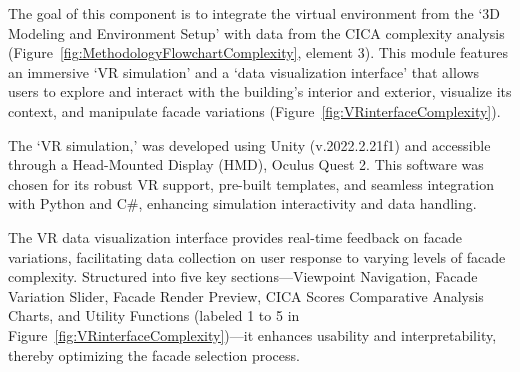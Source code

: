 %


The goal of this component is to integrate the virtual environment from the `3D Modeling and Environment Setup' with data from the CICA complexity analysis (Figure~\ref{fig:MethodologyFlowchartComplexity}, element 3).
This module features an immersive `VR simulation' and a `data visualization interface' that allows users to explore and interact with the building's interior and exterior, visualize its context, and manipulate facade variations (Figure~\ref{fig:VRinterfaceComplexity}).

The `VR simulation,' was developed using Unity (v.2022.2.21f1) and accessible through a Head-Mounted Display (HMD), Oculus Quest 2.
This software was chosen for its robust VR support, pre-built templates, and seamless integration with Python and C\#, enhancing simulation interactivity and data handling.

The VR data visualization interface provides real-time feedback on facade variations, facilitating data collection on user response to varying levels of facade complexity.
Structured into five key sections—Viewpoint Navigation, Facade Variation Slider, Facade Render Preview, CICA Scores Comparative Analysis Charts, and Utility Functions (labeled 1 to 5 in Figure~\ref{fig:VRinterfaceComplexity})—it enhances usability and interpretability, thereby optimizing the facade selection process.





